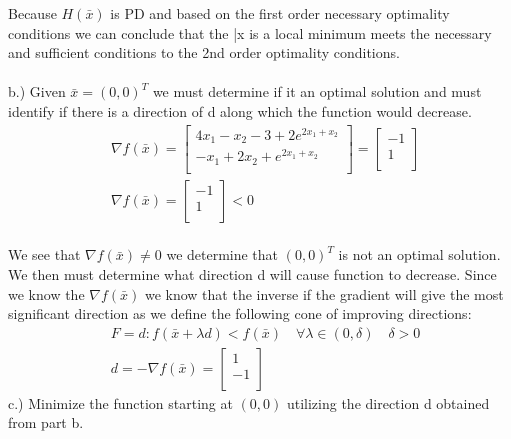\documentclass[12pt]{article}
\begin{document}
Because $H(\bar x)$ is PD and based on the first order necessary optimality conditions we can conclude that the \bar x is a local minimum meets the necessary and sufficient conditions to the 2nd order optimality conditions.\\ \\
b.) Given $\bar x = (0,0)^T$ we must determine if it an optimal solution and must identify if there is a direction of d along which the function would decrease.\\
    \begin{align*}
        &\nabla f(\bar x) = 
        \begin{bmatrix}
            4x_1 -x_2 -3 + 2 e^{2x_1 + x_2}\\
            -x_1 + 2x_2 + e^{2x_1 + x_2}\\
        \end{bmatrix} 
        = 
        \begin{bmatrix}
            -1\\
            1\\
        \end{bmatrix}\\
        &\nabla f(\bar x) = 
        \begin{bmatrix}
            -1\\
            1\\
        \end{bmatrix} < 0
    \end{align*}\\
We see that $\nabla f(\bar x) \neq 0$ we determine that $(0,0)^T$ is not an optimal solution. We then must determine what direction d will cause function to decrease. Since we know the $\nabla f(\bar x)$ we know that the inverse if the gradient will give the most significant direction as we define the following cone of improving directions: \\ 
    \begin{align*}
        &F = d: f(\bar x + \lambda d) < f(\bar x) \quad \forall \lambda \in (0, \delta) \quad \delta > 0\\
        &d = -\nabla f(\bar x) = 
        \begin{bmatrix}
            1\\
            -1\\
        \end{bmatrix}
    \end{align*}
c.)  Minimize the function starting at $(0,0)$ utilizing the direction d obtained from part b.\\
\end{document}
